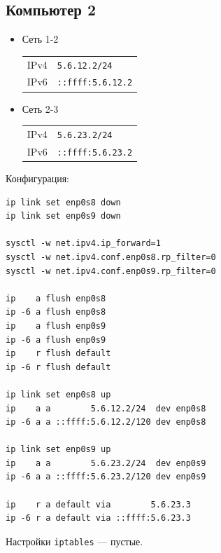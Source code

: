 \subsection{Компьютер 2}
\begin{itemize}
    \item Сеть 1-2

    \begin{tabular}{ll}
        IPv4 & \texttt{5.6.12.2/24}     \\
        IPv6 & \texttt{::ffff:5.6.12.2} \\
    \end{tabular}

    \item Сеть 2-3

    \begin{tabular}{ll}
        IPv4 & \texttt{5.6.23.2/24}     \\
        IPv6 & \texttt{::ffff:5.6.23.2} \\
    \end{tabular}
\end{itemize}

Конфигурация:
\begin{verbatim}
ip link set enp0s8 down
ip link set enp0s9 down

sysctl -w net.ipv4.ip_forward=1
sysctl -w net.ipv4.conf.enp0s8.rp_filter=0
sysctl -w net.ipv4.conf.enp0s9.rp_filter=0

ip    a flush enp0s8
ip -6 a flush enp0s8
ip    a flush enp0s9
ip -6 a flush enp0s9
ip    r flush default
ip -6 r flush default

ip link set enp0s8 up
ip    a a        5.6.12.2/24  dev enp0s8
ip -6 a a ::ffff:5.6.12.2/120 dev enp0s8

ip link set enp0s9 up
ip    a a        5.6.23.2/24  dev enp0s9
ip -6 a a ::ffff:5.6.23.2/120 dev enp0s9

ip    r a default via        5.6.23.3
ip -6 r a default via ::ffff:5.6.23.3
\end{verbatim}

Настройки \texttt{iptables} --- пустые.

